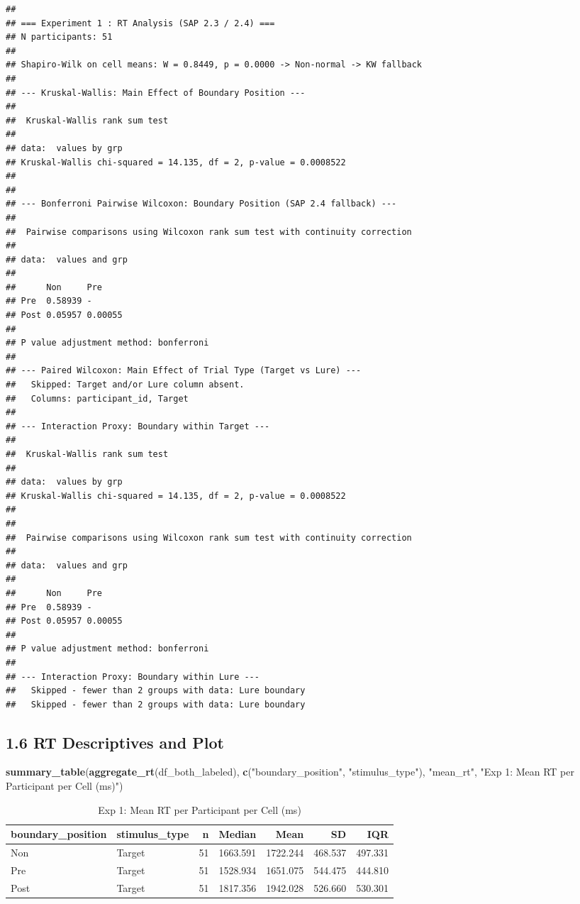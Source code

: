 \documentclass[
]{article}
\newenvironment{Shaded}{\begin{snugshade}}{\end{snugshade}}
\newcommand{\FunctionTok}[1]{\textcolor[rgb]{0.13,0.29,0.53}{\textbf{#1}}}
\newcommand{\NormalTok}[1]{#1}
\newcommand{\StringTok}[1]{\textcolor[rgb]{0.31,0.60,0.02}{#1}}
\begin{document}
\begin{verbatim}
## 
## === Experiment 1 : RT Analysis (SAP 2.3 / 2.4) ===
## N participants: 51 
## 
## Shapiro-Wilk on cell means: W = 0.8449, p = 0.0000 -> Non-normal -> KW fallback
## 
## --- Kruskal-Wallis: Main Effect of Boundary Position ---
## 
##  Kruskal-Wallis rank sum test
## 
## data:  values by grp
## Kruskal-Wallis chi-squared = 14.135, df = 2, p-value = 0.0008522
## 
## 
## --- Bonferroni Pairwise Wilcoxon: Boundary Position (SAP 2.4 fallback) ---
## 
##  Pairwise comparisons using Wilcoxon rank sum test with continuity correction 
## 
## data:  values and grp 
## 
##      Non     Pre    
## Pre  0.58939 -      
## Post 0.05957 0.00055
## 
## P value adjustment method: bonferroni 
## 
## --- Paired Wilcoxon: Main Effect of Trial Type (Target vs Lure) ---
##   Skipped: Target and/or Lure column absent.
##   Columns: participant_id, Target 
## 
## --- Interaction Proxy: Boundary within Target ---
## 
##  Kruskal-Wallis rank sum test
## 
## data:  values by grp
## Kruskal-Wallis chi-squared = 14.135, df = 2, p-value = 0.0008522
## 
## 
##  Pairwise comparisons using Wilcoxon rank sum test with continuity correction 
## 
## data:  values and grp 
## 
##      Non     Pre    
## Pre  0.58939 -      
## Post 0.05957 0.00055
## 
## P value adjustment method: bonferroni 
## 
## --- Interaction Proxy: Boundary within Lure ---
##   Skipped - fewer than 2 groups with data: Lure boundary 
##   Skipped - fewer than 2 groups with data: Lure boundary
\end{verbatim}

\subsection{1.6 RT Descriptives and
Plot}\label{rt-descriptives-and-plot}

\begin{Shaded}
\begin{Highlighting}[]
\FunctionTok{summary\_table}\NormalTok{(}\FunctionTok{aggregate\_rt}\NormalTok{(df\_both\_labeled),}
              \FunctionTok{c}\NormalTok{(}\StringTok{"boundary\_position"}\NormalTok{, }\StringTok{"stimulus\_type"}\NormalTok{),}
              \StringTok{"mean\_rt"}\NormalTok{, }\StringTok{"Exp 1: Mean RT per Participant per Cell (ms)"}\NormalTok{)}
\end{Highlighting}
\end{Shaded}

\begingroup\fontsize{12}{14}\selectfont

\begin{longtable}[t]{llrrrrr}
\caption{\label{tab:exp1_rt_desc}Exp 1: Mean RT per Participant per Cell (ms)}\\
\toprule
boundary\_position & stimulus\_type & n & Median & Mean & SD & IQR\\
\midrule
Non & Target & 51 & 1663.591 & 1722.244 & 468.537 & 497.331\\
Pre & Target & 51 & 1528.934 & 1651.075 & 544.475 & 444.810\\
Post & Target & 51 & 1817.356 & 1942.028 & 526.660 & 530.301\\
\bottomrule
\end{longtable}
\endgroup{}
\end{document}
